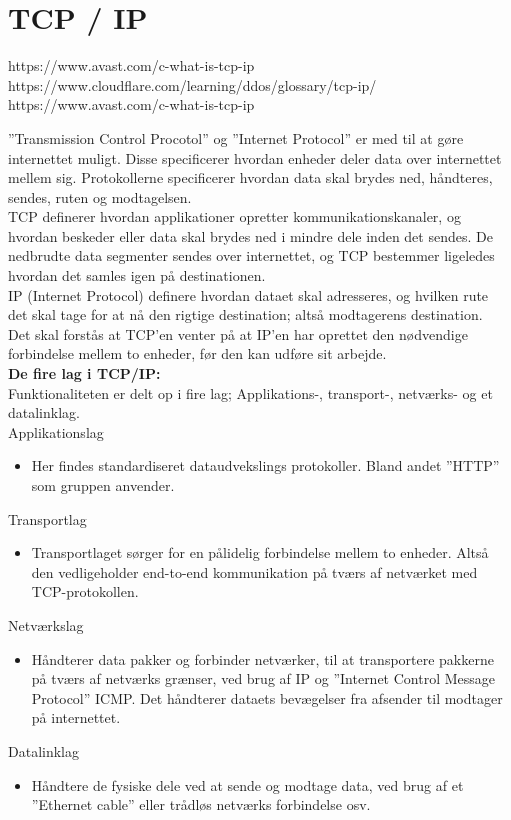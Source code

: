\section{TCP / IP}\label{sec:tcp}
https://www.avast.com/c-what-is-tcp-ip
https://www.cloudflare.com/learning/ddos/glossary/tcp-ip/
https://www.avast.com/c-what-is-tcp-ip

”Transmission Control Procotol” og ”Internet Protocol” er med til at gøre internettet muligt. 
Disse specificerer hvordan enheder deler data over internettet mellem sig. 
Protokollerne specificerer hvordan data skal brydes ned, håndteres, sendes, ruten og modtagelsen.\\

TCP definerer hvordan applikationer opretter kommunikationskanaler, 
og hvordan beskeder eller data skal brydes ned i mindre dele inden det sendes. 
De nedbrudte data segmenter sendes over internettet, 
og TCP bestemmer ligeledes hvordan det samles igen på destinationen. \\

IP (Internet Protocol) definere hvordan dataet skal adresseres, 
og hvilken rute det skal tage for at nå den rigtige destination; altså modtagerens destination. \\

Det skal forstås at TCP’en venter på at IP’en har oprettet den nødvendige forbindelse mellem to enheder, 
før den kan udføre sit arbejde. \\

\textbf{De fire lag i TCP/IP:} \\
Funktionaliteten er delt op i fire lag; Applikations-, transport-, netværks- og et datalinklag.\\

Applikationslag
\begin{itemize}
    \item Her findes standardiseret dataudvekslings protokoller. Bland andet ”HTTP” som gruppen anvender.\\
\end{itemize} 

Transportlag
\begin{itemize}
    \item Transportlaget sørger for en pålidelig forbindelse mellem to enheder. 
    Altså den vedligeholder end-to-end kommunikation på tværs af netværket med TCP-protokollen.\\
\end{itemize}

Netværkslag
\begin{itemize}
    \item Håndterer data pakker og forbinder netværker, 
    til at transportere pakkerne på tværs af netværks grænser, 
    ved brug af IP og ”Internet Control Message Protocol” ICMP. 
    Det håndterer dataets bevægelser fra afsender til modtager på internettet.\\
\end{itemize}

Datalinklag
\begin{itemize}
    \item Håndtere de fysiske dele ved at sende og modtage data, 
    ved brug af et ”Ethernet cable” eller trådløs netværks forbindelse osv.\\
\end{itemize}

